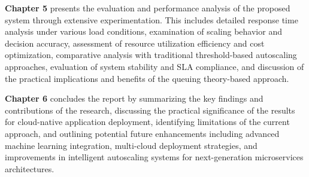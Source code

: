 \vspace{0.4cm}
\textbf{Chapter 5} presents the evaluation and performance analysis of the proposed system through extensive experimentation. This includes detailed response time analysis under various load conditions, examination of scaling behavior and decision accuracy, assessment of resource utilization efficiency and cost optimization, comparative analysis with traditional threshold-based autoscaling approaches, evaluation of system stability and SLA compliance, and discussion of the practical implications and benefits of the queuing theory-based approach.

\vspace{0.4cm}
\textbf{Chapter 6} concludes the report by summarizing the key findings and contributions of the research, discussing the practical significance of the results for cloud-native application deployment, identifying limitations of the current approach, and outlining potential future enhancements including advanced machine learning integration, multi-cloud deployment strategies, and improvements in intelligent autoscaling systems for next-generation microservices architectures.

\endgroup
